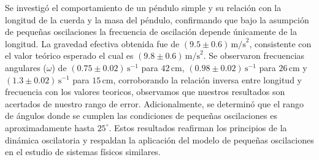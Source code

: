 \documentclass[12pt,a4]{article}
\begin{document}
Se investigó el comportamiento de un péndulo simple y su relación con la longitud de la cuerda y la masa del péndulo, confirmando que bajo la asumpción de pequeñas oscilaciones la frecuencia de oscilación depende únicamente de la longitud. La gravedad efectiva obtenida fue de \((9.5 \pm 0.6) \, \text{m/s}^2\), consistente con el valor teórico esperado el cual es \((9.8 \pm 0.6) \, \text{m/s}^2\). Se observaron frecuencias angulares (\(\omega\)) de \((0.75 \pm 0.02)\, \text{s}^{-1}\) para \(42 \, \text{cm}\), \((0.98 \pm 0.02) \, \text{s}^{-1}\) para \(26 \, \text{cm}\) y \((1.3 \pm 0.02) \, \text{s}^{-1}\) para \(15 \, \text{cm}\), corroborando la relación inversa entre longitud y frecuencia con los valores teoricos, observamos que nuestros resultados son acertados de nuestro rango de error. Adicionalmente, se determinó que el rango de ángulos donde se cumplen las condiciones de pequeñas oscilaciones es aproximadamente hasta $25^\circ$. Estos resultados reafirman los principios de la dinámica oscilatoria y respaldan la aplicación del modelo de pequeñas oscilaciones en el estudio de sistemas físicos similares.
\end{document}
